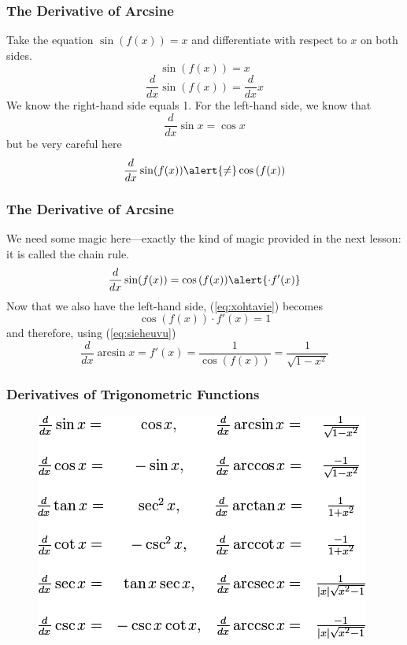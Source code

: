 \documentclass[xcolor=dvipsnames]{beamer}
\begin{document}
\begin{frame}
  \frametitle{The Derivative of Arcsine}
Take the equation $\sin(f(x))=x$ and differentiate with respect to $x$
on both sides.
\begin{equation}
  \label{eq:heipaeng}
  \sin(f(x))=x
\end{equation}
\begin{equation}
  \label{eq:xohtavie}
  \frac{d}{dx}\sin(f(x))=\frac{d}{dx}x
\end{equation}
We know the right-hand side equals 1. For the left-hand side, we know that
\begin{equation}
  \label{eq:keeshoot}
  \frac{d}{dx}\sin{}x=\cos{}x
\end{equation}
but be very careful here
\begin{equation}
  \label{eq:ungitoov}
  \frac{d}{dx}\sin(f(x))\alert{\neq}\cos{}(f(x))
\end{equation}
\end{frame}

\begin{frame}
  \frametitle{The Derivative of Arcsine}
  We need some magic here---exactly the kind of magic provided in the
  next lesson: it is called the chain rule.
  \begin{equation}
    \label{eq:eeceiloh}
  \frac{d}{dx}\sin(f(x))=\cos{}(f(x))\alert{\cdot{}f'(x)}
  \end{equation}
  Now that we also have the left-hand side, (\ref{eq:xohtavie}) becomes
  \begin{equation}
    \label{eq:ahtiegho}
    \cos{}(f(x))\cdot{}f'(x)=1
  \end{equation}
  and therefore, using (\ref{eq:sieheuvu})
  \begin{equation}
    \label{eq:phiquael}
    \frac{d}{dx}\arcsin{}x=f'(x)=\frac{1}{\cos{}(f(x))}=\frac{1}{\sqrt{1-x^{2}}}
  \end{equation}
\end{frame}

\begin{frame}
  \frametitle{Derivatives of Trigonometric Functions}
\begin{figure}[h]
\includegraphics[scale=.6]{./diagrams/trigdiff.png}
\end{figure}
\end{frame}
\end{document}
